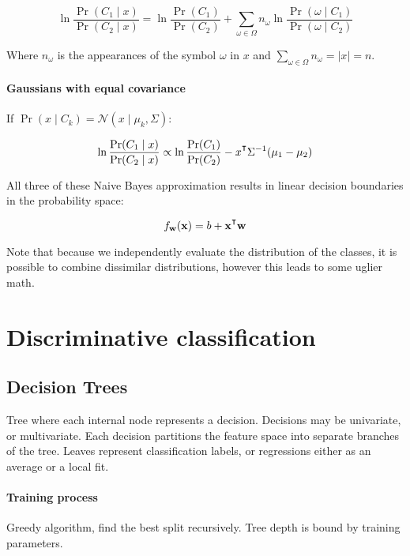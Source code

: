 \documentclass{idc_msc}
\renewcommand{\T}{{\mathpalette\raiseT\intercal}} %
\begin{document}
\[
\ln \frac{\Pr(C_1 \mid x)}{\Pr(C_2 \mid x)}
= \ln \frac{\Pr(C_1)}{\Pr(C_2)} + \sum_{\omega \in \Omega} n_\omega \ln \frac{\Pr(\omega \mid C_1)}{\Pr(\omega \mid C_2)}
\]

Where \(n_\omega\) is the appearances of the symbol \(\omega\) in \(x\) and \(\sum_{\omega \in \Omega} n_\omega = |x| = n\).

\paragraph{Gaussians with equal covariance}

If \(\Pr(x\mid C_k) = \mathcal{N} ( x \mid \mu_k, \Sigma)\):

\[
\ln \frac{\Pr(C_1 \mid x)}{\Pr(C_2 \mid x)}
\propto \ln \frac{\Pr(C_1)}{\Pr(C_2)} - x^\T \Sigma^{-1}(\mu_1 - \mu_2)
\]

All three of these Naive Bayes approximation results in linear decision boundaries in the probability space:

\[f_\mathbf{w}(\mathbf{x}) = b + \mathbf{x}^\T \mathbf{w}\]

Note that because we independently evaluate the distribution of the classes, it is possible to combine dissimilar distributions, however this leads to some uglier math.


\clearpage
\section{Discriminative classification}

\subsection{Decision Trees}

Tree where each internal node represents a decision.
Decisions may be univariate, or multivariate.
Each decision partitions the feature space into separate branches of the tree.
Leaves represent classification labels, or regressions either as an average or a local fit.

\paragraph{Training process}

Greedy algorithm, find the best split recursively.
Tree depth is bound by training parameters.

\end{document}
